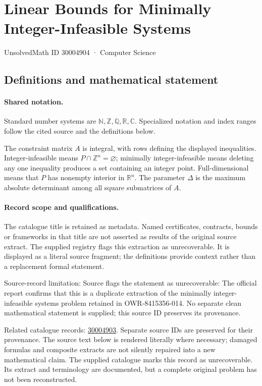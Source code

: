 \documentclass[11pt]{article}
\begin{document}
\setcounter{section}{30004903}
\section{Linear Bounds for Minimally Integer-Infeasible Systems}\label{30004904}
{\small\sffamily UnsolvedMath ID 30004904 · Computer Science}
\subsection{Definitions and mathematical statement}

\paragraph{Shared notation.}Standard number systems are $\mathbb N,\mathbb Z,\mathbb Q,\mathbb R,\mathbb C$. Specialized notation and index ranges follow the cited source and the definitions below.


The constraint matrix $A$ is integral, with rows defining the displayed inequalities. Integer-infeasible means $P\cap\mathbb Z^n=\varnothing$; minimally integer-infeasible means deleting any one inequality produces a set containing an integer point. Full-dimensional means that $P$ has nonempty interior in $\mathbb R^n$. The parameter $\Delta$ is the maximum absolute determinant among all square submatrices of $A$.
\paragraph{Record scope and qualifications.}
The catalogue title is retained as metadata. Named certificates, contracts, bounds or frameworks in that title are not asserted as results of the original source extract.
The supplied registry flags this extraction as unrecoverable. It is displayed as a literal source fragment; the definitions provide context rather than a replacement formal statement.

Source-record limitation: Source flags the statement as unrecoverable: The official report confirms that this is a duplicate extraction of the minimally integer-infeasible systems problem retained in OWR-8415356-014. No separate clean mathematical statement is supplied; this source ID preserves its provenance.

Related catalogue records: \href{https://mehmetmars7.github.io/Erdosproblems-llm-hunter/problem.html?type=open_problems&id=30004903}{30004903}. Separate source IDs are preserved for their provenance.
The source text below is rendered literally where necessary; damaged formulas and composite extracts are not silently repaired into a new mathematical claim.
The supplied catalogue marks this record as unrecoverable. Its extract and terminology are documented, but a complete original problem has not been reconstructed.
\end{document}
